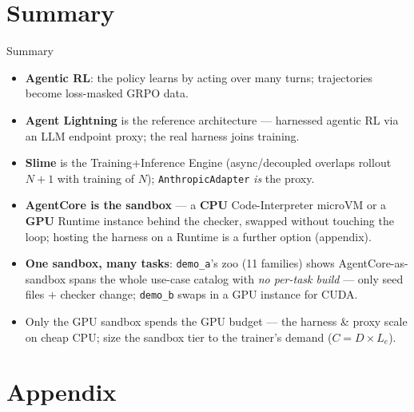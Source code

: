 \documentclass[aspectratio=169]{beamer}
\begin{document}
\section*{Summary}

\begin{frame}{Summary}
  \begin{itemize}\setlength\itemsep{0.35em}
    \item \textbf{Agentic RL}: the policy learns by acting over many turns; trajectories become
      loss-masked GRPO data.
    \item \textbf{Agent Lightning} is the reference architecture --- harnessed agentic RL via an LLM
      endpoint proxy; the real harness joins training.
    \item \textbf{Slime} is the Training+Inference Engine (async/decoupled overlaps rollout $N{+}1$
      with training of $N$); \texttt{AnthropicAdapter} \emph{is} the proxy.
    \item \textbf{AgentCore is the sandbox} --- a \textbf{CPU} Code-Interpreter microVM or a
      \textbf{GPU} Runtime instance behind the checker, swapped without touching the loop; hosting
      the harness on a Runtime is a further option (appendix).
    \item \textbf{One sandbox, many tasks}: \texttt{demo\_a}'s zoo (11 families) shows AgentCore-as-sandbox
      spans the whole use-case catalog with \emph{no per-task build} --- only seed files $+$ checker
      change; \texttt{demo\_b} swaps in a GPU instance for CUDA.
    \item Only the GPU sandbox spends the GPU budget --- the harness \& proxy scale on cheap CPU;
      size the sandbox tier to the trainer's demand ($C = D \times L_e$).
  \end{itemize}
\end{frame}

\appendix
\section{Appendix}
\end{document}
